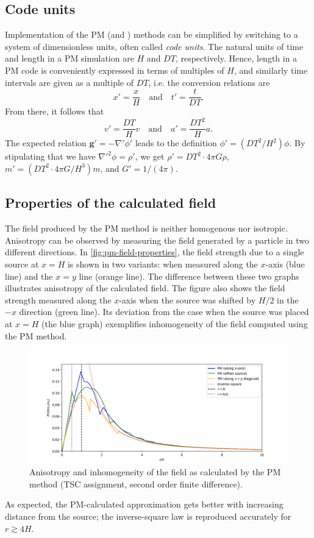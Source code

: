 \subsection{Code units}
Implementation of the PM (and \PThreeM{}) methods can be simplified by switching to a system of dimensionless units, often called \textit{code units}.
The natural units of time and length in a PM simulation are $H$ and $DT$, respectively.
Hence, length in a PM code is conveniently expressed in terms of multiples of $H$, and similarly time intervals are given as a multiple of $DT$, i.e. the conversion relations are
\begin{equation*}
    x' = \frac{x}{H} \quad \text{and} \quad t' = \frac{t}{DT}.
\end{equation*}
From there, it follows that
\begin{equation*}
    v' = \frac{DT}{H}v \quad \text{and} \quad a' = \frac{DT^2}{H}a.
\end{equation*}
The expected relation $\mathbf{g}' = -\nabla' \phi'$ leads to the definition $\phi' = (DT^2 / H^2)\phi$.
By stipulating that we have $\nabla'^2\phi = \rho'$, we get $\rho' = DT^2 \cdot 4\pi G\rho$, $m' = (DT^2\cdot 4\pi G / H^3) m$, and $G' = 1/(4\pi)$.

\subsection{Properties of the calculated field}
The field produced by the PM method is neither homogenous nor isotropic.
Anisotropy can be observed by measuring the field generated by a particle in two different directions.
In \autoref{fig:pm-field-properties}, the field strength due to a single source at $x = H$ is shown in two variants: when measured along the $x$-axis (blue line) and the $x=y$ line (orange line).
The difference between these two graphs illustrates anisotropy of the calculated field.
The figure also shows the field strength measured along the $x$-axis when the source was shifted by $H/2$ in the $-x$ direction (green line).
Its deviation from the case when the source was placed at $x=H$ (the blue graph) exemplifies inhomogeneity of the field computed using the PM method.
\begin{figure}[htp]
    \centering
    \includegraphics[scale=0.55]{img/pm/pm-field-combined.png}
    \caption{Anisotropy and inhomogeneity of the field as calculated by the PM method (TSC assignment, second order finite difference).}
    \label{fig:pm-field-properties}
\end{figure}
As expected, the PM-calculated approximation gets better with increasing distance from the source;
the inverse-square law is reproduced accurately for $r \gtrsim 4H$.


